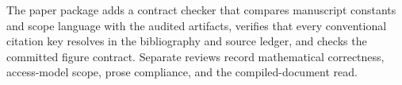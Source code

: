The paper package adds a contract checker that compares manuscript constants and scope language with the audited artifacts, verifies that every conventional citation key resolves in the bibliography and source ledger, and checks the committed figure contract. Separate reviews record mathematical correctness, access-model scope, prose compliance, and the compiled-document read.
